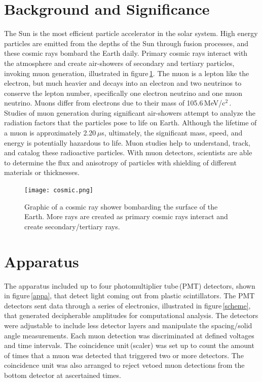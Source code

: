 \documentclass[aps,prl,twocolumn,superscriptaddress,nofootinbib]{revtex4-1}
\begin{document}
\section{Background and Significance}
The Sun is the most efficient particle accelerator in the solar system. High energy particles are emitted from the depths of the Sun through fusion processes, and these cosmic rays bombard the Earth daily. Primary cosmic rays interact with the atmosphere and create air-showers of secondary and tertiary particles, invoking muon generation, illustrated in figure\,\ref{cosmic}. The muon is a lepton like the electron, but much heavier and decays into an electron and two neutrinos to conserve the lepton number, specifically one electron neutrino and one muon neutrino. Muons differ from electrons due to their mass of 105.6\,MeV/c$^2$\,\cite{1}.
\\
\indent Studies of muon generation during significant air-showers attempt to analyze the radiation factors that the particles pose to life on Earth. Although the lifetime of a muon is approximately 2.20\,$\mu$s, ultimately, the significant mass, speed, and energy is potentially hazardous to life. Muon studies help to understand, track, and catalog these radioactive particles. With muon detectors, scientists are able to determine the flux and anisotropy of particles with shielding of different materials or thicknesses.

\begin{figure}[htb]
  \begin{center}
\centerline{\texttt{[image: cosmic.png]}}
\caption{ \small{Graphic of a cosmic ray shower bombarding the surface of the Earth. More rays are created as primary cosmic rays interact and create secondary/tertiary rays.\,\cite{2}}}
\label{cosmic}
  \end{center}
\end{figure}



\section{Apparatus}


The apparatus included up to four photomultiplier tube\,(PMT) detectors, shown in figure\,\ref{appa}, that detect light coming out from plastic scintillators. The PMT detectors sent data through a series of electronics, illustrated in figure\,\ref{scheme}, that generated decipherable amplitudes for computational analysis. The detectors were adjustable to include less detector layers and manipulate the spacing/solid angle measurements. Each muon detection was discriminated at defined voltages and time intervals. The coincidence unit\,(scaler) was set up to count the amount of times that a muon was detected that triggered two or more detectors. The coincidence unit was also arranged to reject vetoed muon detections from the bottom detector at ascertained times.
\end{document}
